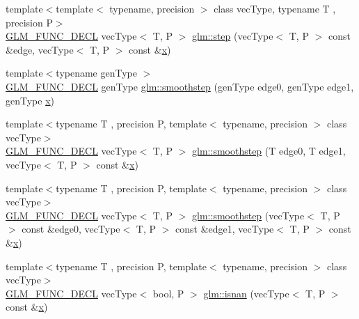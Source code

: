 \begin{DoxyCompactItemize}
\item 
{\footnotesize template$<$template$<$ typename, precision $>$ class vec\+Type, typename T , precision P$>$ }\\\mbox{\hyperlink{setup_8hpp_ab2d052de21a70539923e9bcbf6e83a51}{G\+L\+M\+\_\+\+F\+U\+N\+C\+\_\+\+D\+E\+CL}} vec\+Type$<$ T, P $>$ \mbox{\hyperlink{group__core__func__common_ga6d84170051fb87c183c38883ec85b411}{glm\+::step}} (vec\+Type$<$ T, P $>$ const \&edge, vec\+Type$<$ T, P $>$ const \&\mbox{\hyperlink{glad_8h_a92d0386e5c19fb81ea88c9f99644ab1d}{x}})
\item 
{\footnotesize template$<$typename gen\+Type $>$ }\\\mbox{\hyperlink{setup_8hpp_ab2d052de21a70539923e9bcbf6e83a51}{G\+L\+M\+\_\+\+F\+U\+N\+C\+\_\+\+D\+E\+CL}} gen\+Type \mbox{\hyperlink{group__core__func__common_ga562edf7eca082cc5b7a0aaf180436daf}{glm\+::smoothstep}} (gen\+Type edge0, gen\+Type edge1, gen\+Type \mbox{\hyperlink{glad_8h_a92d0386e5c19fb81ea88c9f99644ab1d}{x}})
\item 
{\footnotesize template$<$typename T , precision P, template$<$ typename, precision $>$ class vec\+Type$>$ }\\\mbox{\hyperlink{setup_8hpp_ab2d052de21a70539923e9bcbf6e83a51}{G\+L\+M\+\_\+\+F\+U\+N\+C\+\_\+\+D\+E\+CL}} vec\+Type$<$ T, P $>$ \mbox{\hyperlink{group__core__func__common_gaeb3d9cf6e832b6d0000cd76e04cef682}{glm\+::smoothstep}} (T edge0, T edge1, vec\+Type$<$ T, P $>$ const \&\mbox{\hyperlink{glad_8h_a92d0386e5c19fb81ea88c9f99644ab1d}{x}})
\item 
{\footnotesize template$<$typename T , precision P, template$<$ typename, precision $>$ class vec\+Type$>$ }\\\mbox{\hyperlink{setup_8hpp_ab2d052de21a70539923e9bcbf6e83a51}{G\+L\+M\+\_\+\+F\+U\+N\+C\+\_\+\+D\+E\+CL}} vec\+Type$<$ T, P $>$ \mbox{\hyperlink{group__core__func__common_ga8b9b9ba3425d603118cf90aee8b32bd6}{glm\+::smoothstep}} (vec\+Type$<$ T, P $>$ const \&edge0, vec\+Type$<$ T, P $>$ const \&edge1, vec\+Type$<$ T, P $>$ const \&\mbox{\hyperlink{glad_8h_a92d0386e5c19fb81ea88c9f99644ab1d}{x}})
\item 
{\footnotesize template$<$typename T , precision P, template$<$ typename, precision $>$ class vec\+Type$>$ }\\\mbox{\hyperlink{setup_8hpp_ab2d052de21a70539923e9bcbf6e83a51}{G\+L\+M\+\_\+\+F\+U\+N\+C\+\_\+\+D\+E\+CL}} vec\+Type$<$ bool, P $>$ \mbox{\hyperlink{group__core__func__common_ga6cb8f202a52eed2331724a3800198ebf}{glm\+::isnan}} (vec\+Type$<$ T, P $>$ const \&\mbox{\hyperlink{glad_8h_a92d0386e5c19fb81ea88c9f99644ab1d}{x}})

\end{DoxyCompactItemize}
